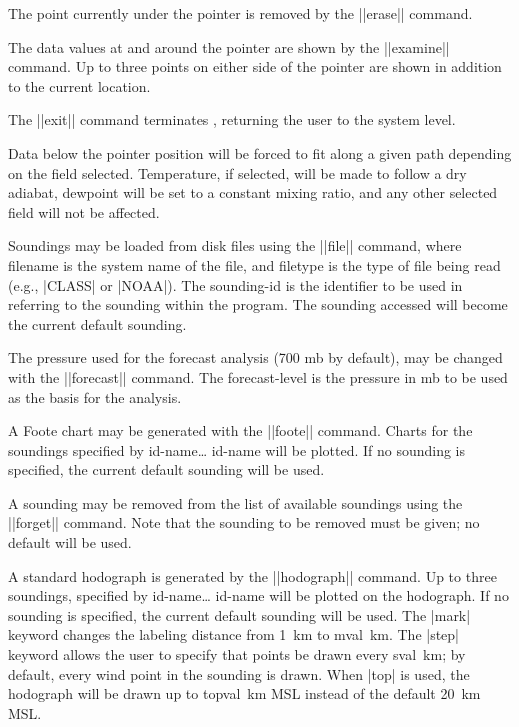\begin{glossarylist}
	The point currently under the pointer is removed by the ||erase||
	command.

	The data values at and around the pointer are shown by the 
	||examine|| command.  Up to three points on either side of the
	pointer are shown in addition to the current location.

	The ||exit|| command terminates \suds, returning the user to the
	system level.

	Data below the pointer position will be forced to fit along a given
	path depending on the field selected.  Temperature, if selected,
	will be made to follow a dry adiabat, dewpoint will be set to
	a constant mixing ratio, and any other selected field will not be
	affected.

	Soundings may be loaded from disk files using the ||file|| command, 
	where {\pf filename} is the system name of the file, and {\pf filetype}
	is the type of file being read (e.g., |CLASS| or |NOAA|).  The
	{\pf sounding-id} is the identifier to be used in referring to the 
	sounding within the program.  The sounding accessed will become the
	current default sounding.

	The pressure used for the forecast analysis (700 mb by default), may
	be changed with the ||forecast|| command.  The {\pf forecast-level} 
	is the pressure in mb to be used as the basis for the analysis.

	A Foote chart may be generated with the ||foote|| command.
	Charts for the soundings specified by {\pf id-name}\ldots 
	{\pf id-name} will be plotted.  If no sounding is specified,
	the current default sounding will be used.

	A sounding may be removed from the list of available soundings using
	the ||forget|| command.  Note that the sounding to be removed must
	be given; no default will be used.

	A standard hodograph is generated by the ||hodograph|| command.
	Up to three soundings, specified by {\pf id-name}\ldots
	{\pf id-name} will be plotted on the hodograph.  If no sounding
	is specified, the current default sounding will be used.  The |mark|
	keyword changes the labeling distance from 1~km to {\pf mval}~km.
	The |step| keyword allows the user to specify that points be drawn 
	every {\pf sval}~km; by default, every wind point in the sounding is 
	drawn.  When |top| is used, the hodograph will be drawn up to
	{\pf topval}~km MSL instead of the default 20~km MSL.


\end{glossarylist}
